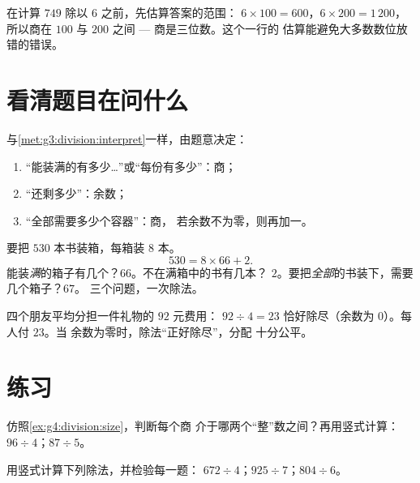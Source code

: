 \begin{example}[估算商的大小]\label{ex:g4:division:size}
在计算 $749$ 除以 $6$ 之前，先估算答案的范围：
$6 \times 100 = 600$，$6 \times 200 = 1\,200$，所以商在
$100$ 与 $200$ 之间 --- 商是三位数。这个一行的
估算能避免大多数数位放错的错误。
\end{example}

\section{看清题目在问什么}

\begin{method}[商、余数，还是商加一]\label{met:g4:division:interpret}
与\cref{met:g3:division:interpret}一样，由题意决定：
\begin{enumerate}
  \item “能装满的有多少\dots”或“每份有多少”：商；
  \item “还剩多少”：余数；
  \item “全部需要多少个容器”：商，
        若余数不为零，则再加一。
\end{enumerate}
\end{method}

\begin{example}\label{ex:g4:division:problem}
要把 $530$ 本书装箱，每箱装 $8$ 本。
\[
530 = 8 \times 66 + 2 .
\]
能装\emph{满}的箱子有几个？$66$。不在满箱中的书有几本？
$2$。要把\emph{全部}的书装下，需要几个箱子？$67$。
三个问题，一次除法。
\end{example}

\begin{example}[公平分钱]\label{ex:g4:division:money}
四个朋友平均分担一件礼物的 $92$ 元费用：
$92 \div 4 = 23$ 恰好除尽（余数为 $0$）。每人付 $23$。当
余数为零时，除法“正好除尽”，分配
十分公平。
\end{example}

\section{练习}

\begin{exercise}[$\star$]\label{exo:g4:division:1}
仿照\cref{ex:g4:division:size}，判断每个商
介于哪两个“整”数之间？再用竖式计算：
$96 \div 4$；\quad $87 \div 5$。
\end{exercise}

\begin{exercise}[$\star$]\label{exo:g4:division:2}
用竖式计算下列除法，并检验每一题：
$672 \div 4$；\quad $925 \div 7$；\quad $804 \div 6$。
\end{exercise}

